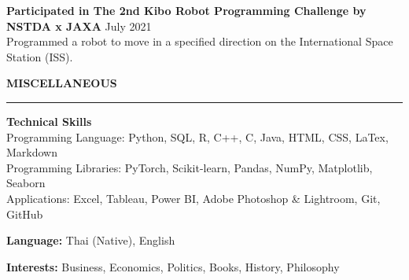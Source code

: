\documentclass[11pt]{article}
\begin{document}
\vspace{6pt}

\textbf{Participated in The 2nd Kibo Robot Programming Challenge by NSTDA x JAXA} \hfill July 2021\\
\hspace*{7pt} Programmed a robot to move in a specified direction on the International Space Station (ISS).

\vspace{12pt}

\textbf{MISCELLANEOUS}
\vspace{5pt}
{\color{NavyBlue}\hrule}
\vspace{9pt}

\textbf{Technical Skills}\\
\hspace*{7pt} Programming Language: Python, SQL, R, C++, C, Java, HTML, CSS, LaTex, Markdown\\
\hspace*{7pt} Programming Libraries: PyTorch, Scikit-learn, Pandas, NumPy, Matplotlib, Seaborn\\
\hspace*{7pt} Applications: Excel, Tableau, Power BI, Adobe Photoshop \& Lightroom, Git, GitHub

\textbf{Language:} Thai (Native), English

\textbf{Interests:} Business, Economics, Politics, Books, History, Philosophy
\end{document}
